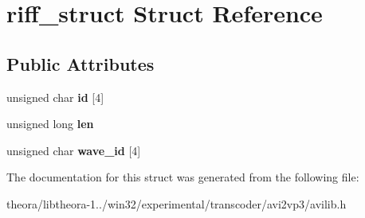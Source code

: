 \hypertarget{structriff__struct}{\section{riff\+\_\+struct Struct Reference}
\label{structriff__struct}
}
\subsection*{Public Attributes}
\begin{DoxyCompactItemize}
\item 
\hypertarget{structriff__struct_aa188385935c9a6e1792744ef32e049b9}{unsigned char {\bfseries id} \mbox{[}4\mbox{]}}\label{structriff__struct_aa188385935c9a6e1792744ef32e049b9}

\item 
\hypertarget{structriff__struct_a7f3e3a6645a5f2ba260da9768bbe665f}{unsigned long {\bfseries len}}\label{structriff__struct_a7f3e3a6645a5f2ba260da9768bbe665f}

\item 
\hypertarget{structriff__struct_a5ca22e2539d1f56a54dd0cf686b699d7}{unsigned char {\bfseries wave\+\_\+id} \mbox{[}4\mbox{]}}\label{structriff__struct_a5ca22e2539d1f56a54dd0cf686b699d7}

\end{DoxyCompactItemize}


The documentation for this struct was generated from the following file\+:\begin{DoxyCompactItemize}
\item 
theora/libtheora-\/1../win32/experimental/transcoder/avi2vp3/avilib.\+h\end{DoxyCompactItemize}
